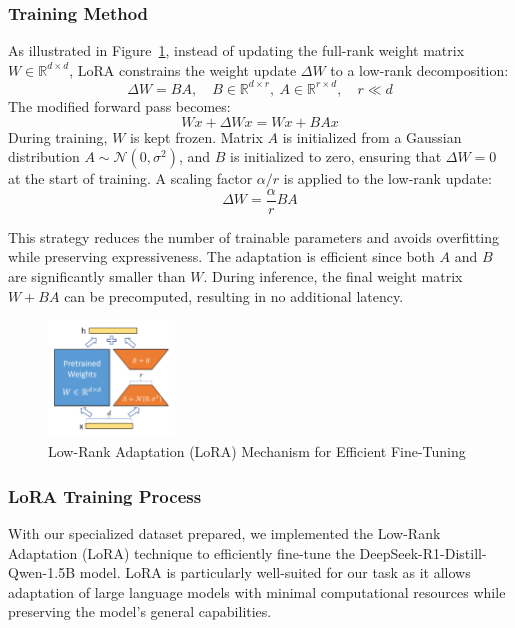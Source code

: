 \documentclass{article}
\begin{document}

\subsubsection{Training Method}
 As illustrated in Figure~\ref{fig:lora_mechanism}, instead of updating the full-rank weight matrix $W \in \mathbb{R}^{d \times d}$, LoRA constrains the weight update $\Delta W$ to a low-rank decomposition:
\[
\Delta W = BA,\quad B \in \mathbb{R}^{d \times r},\ A \in \mathbb{R}^{r \times d},\quad r \ll d
\]
The modified forward pass becomes:
\[
Wx + \Delta Wx = W x + BAx
\]
During training, $W$ is kept frozen. Matrix $A$ is initialized from a Gaussian distribution $A \sim \mathcal{N}(0, \sigma^2)$, and $B$ is initialized to zero, ensuring that $\Delta W = 0$ at the start of training. A scaling factor $\alpha/r$ is applied to the low-rank update:
\[
\Delta W = \frac{\alpha}{r} BA
\]

This strategy reduces the number of trainable parameters and avoids overfitting while preserving expressiveness. The adaptation is efficient since both $A$ and $B$ are significantly smaller than $W$. During inference, the final weight matrix $W + BA$ can be precomputed, resulting in no additional latency.

\label{sssec:lora_training}
    \begin{figure}[htb]
    \centering
    \includegraphics[width=0.3\textwidth]{images/Lora.png}
    \caption{Low-Rank Adaptation (LoRA) Mechanism for Efficient Fine-Tuning}
    \label{fig:lora_mechanism}
    \end{figure}
\subsubsection{LoRA Training Process}

With our specialized dataset prepared, we implemented the Low-Rank Adaptation (LoRA) technique to efficiently fine-tune the DeepSeek-R1-Distill-Qwen-1.5B model. LoRA is particularly well-suited for our task as it allows adaptation of large language models with minimal computational resources while preserving the model's general capabilities.
\end{document}
